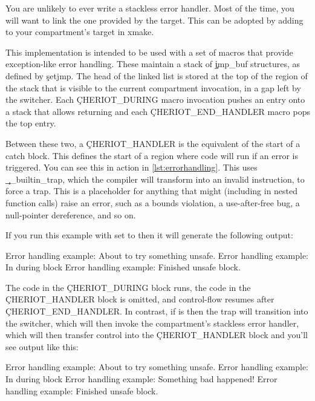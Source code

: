 You are unlikely to ever write a stackless error handler.
Most of the time, you will want to link the one provided by the  target.
This can be adopted by adding  to your compartment's target in xmake.

This implementation is intended to be used with a set of macros that provide exception-like error handling.
These maintain a stack of \c{jmp_buf} structures, as defined by \c{setjmp}.
The head of the linked list is stored at the top of the region of the stack that is visible to the current compartment invocation, in a gap left by the switcher.
Each \c{CHERIOT_DURING} macro invocation pushes an entry onto a stack that allows returning and each \c{CHERIOT_END_HANDLER} macro pops the top entry.

Between these two, a \c{CHERIOT_HANDLER} is the equivalent of the start of a catch block.
This defines the start of a region where code will run if an error is triggered.
You can see this in action in \ref{lst:errorhandling}.
This uses \c{__builtin_trap}, which the compiler will transform into an invalid instruction, to force a trap.
This is a placeholder for anything that might (including in nested function calls) raise an error, such as a bounds violation, a use-after-free bug, a null-pointer dereference, and so on.


\codelisting[marker=error,caption=Example of using scoped error handling,label=lst:errorhandling, filename=examples/error_handling/errors.cc]{}

If you run this example with  set to  then it will generate the following output:

\begin{console}
Error handling example: About to try something unsafe.
Error handling example: In during block
Error handling example: Finished unsafe block.
\end{console}

The code in the \c{CHERIOT_DURING} block runs, the code in the \c{CHERIOT_HANDLER} block is omitted, and control-flow resumes after \c{CHERIOT_END_HANDLER}.
In contrast, if  is  then the trap will transition into the switcher, which will then invoke the compartment's stackless error handler, which will then transfer control into the \c{CHERIOT_HANDLER} block and you'll see output like this:

\begin{console}
Error handling example: About to try something unsafe.
Error handling example: In during block
Error handling example: Something bad happened!
Error handling example: Finished unsafe block.
\end{console}

